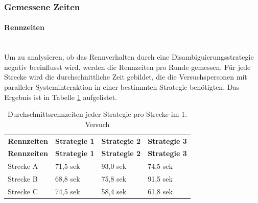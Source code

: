 \documentclass[12pt,a4paper]{scrartcl}
\begin{document}
\subsubsection{Gemessene Zeiten}
\label{messwerte1}
\paragraph{Rennzeiten} 
~\\
Um zu analysieren, ob das Rennverhalten durch eine Disambiguierungsstrategie negativ beeinflusst wird, werden die Rennzeiten pro Runde gemessen. Für jede Strecke wird die durchschnittliche Zeit gebildet, die die Versuchspersonen mit paralleler Systeminteraktion in einer bestimmten Strategie benötigten. Das Ergebnis ist in Tabelle \ref{RZ3SV1} aufgelistet.

\begin{longtable}{p{3cm}p{3cm}p{3cm}p{3cm} }
	\label{RZ3SV1}\\
	\caption[Durchschnittsrennzeiten jeder Strategie pro Strecke im 1. Versuch]{Durchschnittsrennzeiten jeder Strategie pro Strecke im 1. Versuch}\\
	\hline
	\textbf{Rennzeiten}&\textbf{Strategie 1}&\textbf{Strategie 2} &\textbf{Strategie 3}\\
	\hline
	\endfirsthead
	\hline
	\textbf{Rennzeiten}&\textbf{Strategie 1}&\textbf{Strategie 2} &\textbf{Strategie 3}\\
	\hline
	\endhead
Strecke A & 71,5 sek & 93,0 sek & 74,5 sek \\
Strecke B & 68,8 sek & 75,8 sek & 91,5 sek \\
Strecke C & 74,5 sek & 58,4 sek & 61,8 sek \\
\hline
\end{longtable}
\end{document}
